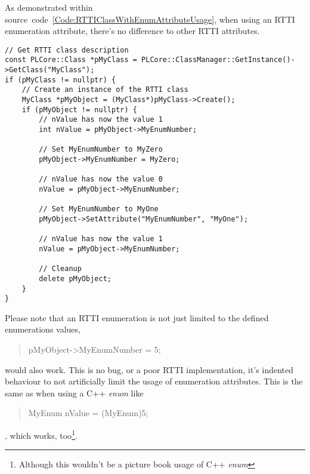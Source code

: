 As demonstrated within source~code~\ref{Code:RTTIClassWithEnumAttributeUsage}, when using an RTTI enumeration attribute, there's no difference to other RTTI attributes.
\begin{lstlisting}[label=Code:RTTIClassWithEnumAttributeUsage,caption={Using a RTTI class with an enumeration attribute}]
// Get RTTI class description
const PLCore::Class *pMyClass = PLCore::ClassManager::GetInstance()->GetClass("MyClass");
if (pMyClass != nullptr) {
	// Create an instance of the RTTI class
	MyClass *pMyObject = (MyClass*)pMyClass->Create();
	if (pMyObject != nullptr) {
		// nValue has now the value 1
		int nValue = pMyObject->MyEnumNumber;

		// Set MyEnumNumber to MyZero
		pMyObject->MyEnumNumber = MyZero;

		// nValue has now the value 0
		nValue = pMyObject->MyEnumNumber;

		// Set MyEnumNumber to MyOne
		pMyObject->SetAttribute("MyEnumNumber", "MyOne");

		// nValue has now the value 1
		nValue = pMyObject->MyEnumNumber;

		// Cleanup
		delete pMyObject;
	}
}
\end{lstlisting}
Please note that an RTTI enumeration is not just limited to the defined enumerations values, \begin{quote}pMyObject->MyEnumNumber = 5;\end{quote} would also work. This is no bug, or a poor RTTI implementation, it's indented behaviour to not artificially limit the usage of enumeration attributes. This is the same as when using a C++ \emph{enum} like \begin{quote}MyEnum nValue = (MyEnum)5;\end{quote}, which works, too\footnote{Although this wouldn't be a picture book usage of C++ \emph{enum}}.


